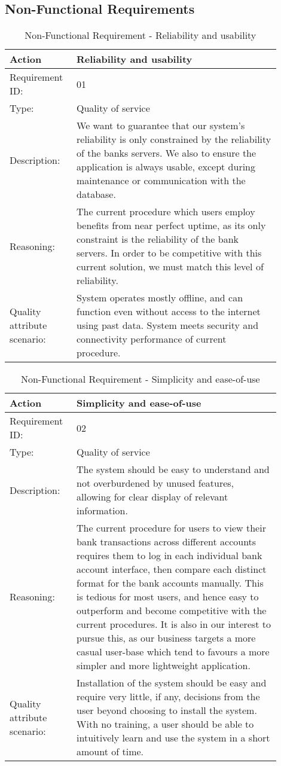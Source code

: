 \documentclass[11pt]{article}
\newcounter{use case ID}
\newcommand\addrow[2]{#1 & #2\\ \hline}
\newcounter{req ID}
\newcommand\tabularheadfsd[1]{
\begin{table}[ht]
    \addtocounter{req ID}{1}
    \caption{Non-Functional Requirement \arabic{req ID} - #1}
    \vspace{0.2cm}
    \begin{tabular}{|p{0.2\linewidth}|p{0.70\linewidth}|}
    \hline
        \textbf{Action} & \textbf{#1} \\
        \hline}
\newenvironment{requirement}{\tabularheadfsd}
{\hline\end{tabular}\end{table}}
\begin{document}
\subsection{Non-Functional Requirements}
\begin{requirement}{Reliability and usability}
    \addrow{Requirement ID:}{01}
    \addrow{Type:}{Quality of service}
    \addrow{Description:}{We want to guarantee that our system's reliability is only constrained by the reliability of the banks servers. We also to ensure the application is always usable, except during maintenance or communication with the database.}
    \addrow{Reasoning:}{The current procedure which users employ benefits from near perfect uptime, as its only constraint is the reliability of the bank servers. In order to be competitive with this current solution, we must match this level of reliability.}
    \addrow{Quality attribute scenario:}{System operates mostly offline, and can function even without access to the internet using past data. System meets security and connectivity performance of current procedure.}
\end{requirement}

\begin{requirement}{Simplicity and ease-of-use}
    \addrow{Requirement ID:}{02}
    \addrow{Type:}{Quality of service}
    \addrow{Description:}{The system should be easy to understand and not overburdened by unused features, allowing for clear display of relevant information.}
    \addrow{Reasoning:}{The current procedure for users to view their bank transactions across different accounts requires them to log in each individual bank account interface, then compare each distinct format for the bank accounts manually. This is tedious for most users, and hence easy to outperform and become competitive with the current procedures. It is also in our interest to pursue this, as our business targets a more casual user-base which tend to favours a more simpler and more lightweight application.}
    \addrow{Quality attribute scenario:}{Installation of the system should be easy and require very little, if any, decisions from the user beyond choosing to install the system. With no training, a user should be able to intuitively learn and use the system in a short amount of time.}
\end{requirement}
\end{document}
